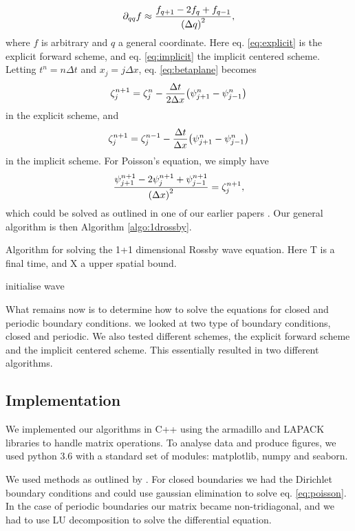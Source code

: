 	\begin{equation}
	\label{eq:doublederivative}
		\partial_{qq} f \approx \frac{f_{q+1} - 2f_q + f_{q-1}}{\qty(\Delta q)^2},
	\end{equation}
where $f$ is arbitrary and $q$ a general coordinate. Here eq. \ref{eq:explicit} is the explicit forward scheme, and eq. \ref{eq:implicit} the implicit centered scheme. Letting $t^n = n\Delta t$ and $x_j = j\Delta x$, eq. \ref{eq:betaplane} becomes
	\begin{equation}
	\label{eq:explicitscheme}
		\zeta^{n+1}_j = \zeta^n_j - \frac{\Delta t}{2 \Delta x}\qty(\psi^n_{j+1} - \psi^n_{j-1})
	\end{equation}
in the explicit scheme, and
	\begin{equation}
	\label{eq:implicitscheme}
		\zeta^{n+1}_j = \zeta^{n-1}_j - \frac{\Delta t}{\Delta x}\qty(\psi^n_{j+1} - \psi^n_{j-1})
	\end{equation}
in the implicit scheme. For Poisson's equation, we simply have
	\begin{equation}
	\label{eq:poissondiscret}
	\frac{\psi^{n+1}_{j+1} - 2\psi^{n+1}_j + \psi^{n+1}_{j-1}}{\qty(\Delta x)^2} = \zeta^{n+1}_j,
	\end{equation}
which could be solved as outlined in one of our earlier papers \citep{sjurkal}. Our general algorithm is then Algorithm \ref{algo:1drossby}.
	\begin{algorithm}[htbp]
		\label{algo:1drossby}
		\caption{Algorithm for solving the 1+1 dimensional Rossby wave equation. Here T is a final time, and X a upper spatial bound.}
		\SetAlgoLined
		\BlankLine
		\BlankLine
		initialise wave\;
		\BlankLine
		\BlankLine
	\end{algorithm}
What remains now is to determine how to solve the equations for closed and periodic boundary conditions.
we looked at two type of boundary conditions, closed and periodic. We also tested different schemes, the explicit forward scheme and the implicit centered scheme. This essentially resulted in two different algorithms.


\subsection{Implementation}
\label{sec:implement}
We implemented our algorithms in C++ using the armadillo and LAPACK libraries to handle matrix operations. To analyse data and produce figures, we used python 3.6 with a standard set of modules: matplotlib, numpy and seaborn.

We used methods as outlined by \citet{sjurkal}. For closed boundaries we had the Dirichlet boundary conditions and could use gaussian elimination to solve eq. \ref{eq:poisson}. In the case of periodic boundaries our matrix became non-tridiagonal, and we had to use LU decomposition to solve the differential equation.
